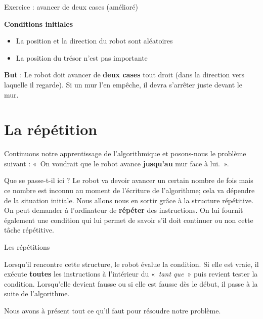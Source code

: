 	
	\begin{Emphase}[exercice]{Exercice : avancer de deux cases (amélioré)}

		\textbf{Conditions initiales}

		\begin{itemize}
		\item La position et la direction du robot sont aléatoires
		\item La position du trésor n'est pas importante
		\end{itemize}
		
		\textbf{But} : Le robot doit avancer de \textbf{deux cases} tout droit
		(dans la direction vers laquelle il regarde). Si un mur
		l'en empêche, il devra s'arrêter
		juste devant le mur.

	\end{Emphase}

\section{La répétition}

	Continuons notre apprentissage de l'algorithmique et
	posons-nous le problème suivant : «~On voudrait que le robot avance
	\textbf{jusqu'au} mur face à lui.~».
	
	Que se passe-t-il ici ? Le robot va devoir avancer un certain nombre de
	fois mais ce nombre est inconnu au moment de
	l'écriture de l'algorithme; cela va
	dépendre de la situation initiale. Nous allons nous en sortir grâce à
	la structure répétitive. On peut demander à
	l'ordinateur de \textbf{répéter} des instructions. On
	lui fournit également une condition qui lui permet de savoir
	s'il doit continuer ou non cette tâche répétitive.

	
	\begin{Emphase}[definition]{Les répétitions}
	\end{Emphase}

	Lorsqu'il rencontre cette structure, le robot évalue la
	condition. Si elle est vraie, il exécute \textbf{toutes} les
	instructions à l'intérieur du «~\textit{tant que~}»
	puis revient tester la condition. Lorsqu'elle devient
	fausse ou si elle est fausse dès le début, il passe à la suite de
	l'algorithme.
	
	Nous avons à présent tout ce qu'il faut pour résoudre
	notre problème.


